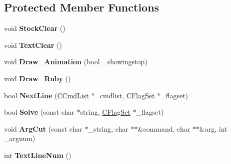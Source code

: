 \subsection*{Protected Member Functions}
\begin{DoxyCompactItemize}
\item 
void {\bfseries Stock\+Clear} ()\hypertarget{class_c_text_box_a85ef90b8276c375140f209720a43620c}{}\label{class_c_text_box_a85ef90b8276c375140f209720a43620c}

\item 
void {\bfseries Text\+Clear} ()\hypertarget{class_c_text_box_a4489f09f66d98d827023f931ea7e4d42}{}\label{class_c_text_box_a4489f09f66d98d827023f931ea7e4d42}

\item 
void {\bfseries Draw\+\_\+\+Animation} (bool \+\_\+showingstop)\hypertarget{class_c_text_box_aecc3d147864ce8f6db8da44beee94618}{}\label{class_c_text_box_aecc3d147864ce8f6db8da44beee94618}

\item 
void {\bfseries Draw\+\_\+\+Ruby} ()\hypertarget{class_c_text_box_aa666b4dec9d3fd299db68bd2079860e0}{}\label{class_c_text_box_aa666b4dec9d3fd299db68bd2079860e0}

\item 
bool {\bfseries Next\+Line} (\hyperlink{class_c_cmd_list}{C\+Cmd\+List} $\ast$\+\_\+cmdlist, \hyperlink{class_c_flag_set}{C\+Flag\+Set} $\ast$\+\_\+flagset)\hypertarget{class_c_text_box_a7b64cd62e3f9ae79df4b0712520f08a4}{}\label{class_c_text_box_a7b64cd62e3f9ae79df4b0712520f08a4}

\item 
bool {\bfseries Solve} (const char $\ast$string, \hyperlink{class_c_flag_set}{C\+Flag\+Set} $\ast$\+\_\+flagset)\hypertarget{class_c_text_box_a4b311191730cb9beaa9650ef9dc93774}{}\label{class_c_text_box_a4b311191730cb9beaa9650ef9dc93774}

\item 
void {\bfseries Arg\+Cut} (const char $\ast$\+\_\+string, char $\ast$$\ast$\&command, char $\ast$$\ast$\&arg, int \+\_\+argnum)\hypertarget{class_c_text_box_aed2ac0a94532d4ec17001bca21e8d22a}{}\label{class_c_text_box_aed2ac0a94532d4ec17001bca21e8d22a}

\item 
int {\bfseries Text\+Line\+Num} ()\hypertarget{class_c_text_box_aef9f285dc1b55c170f14b571f7b788de}{}\label{class_c_text_box_aef9f285dc1b55c170f14b571f7b788de}

\end{DoxyCompactItemize}
